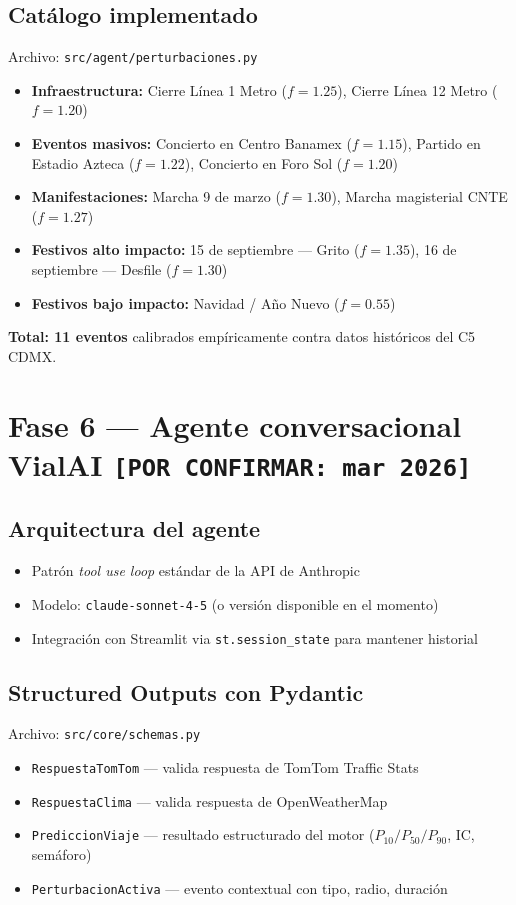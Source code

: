 \documentclass[11pt,a4paper]{article}
\begin{document}
\subsection{Catálogo implementado}
Archivo: \texttt{src/agent/perturbaciones.py}
\begin{itemize}
  \item \textbf{Infraestructura:} Cierre Línea 1 Metro ($f = 1.25$), Cierre Línea 12 Metro ($f = 1.20$)
  \item \textbf{Eventos masivos:} Concierto en Centro Banamex ($f = 1.15$), Partido en Estadio Azteca ($f = 1.22$), Concierto en Foro Sol ($f = 1.20$)
  \item \textbf{Manifestaciones:} Marcha 9 de marzo ($f = 1.30$), Marcha magisterial CNTE ($f = 1.27$)
  \item \textbf{Festivos alto impacto:} 15 de septiembre --- Grito ($f = 1.35$), 16 de septiembre --- Desfile ($f = 1.30$)
  \item \textbf{Festivos bajo impacto:} Navidad / Año Nuevo ($f = 0.55$)
\end{itemize}
\textbf{Total: 11 eventos} calibrados empíricamente contra datos históricos del C5 CDMX.

\section{Fase 6 --- Agente conversacional VialAI \texttt{[POR CONFIRMAR: mar 2026]}}

\subsection{Arquitectura del agente}
\begin{itemize}
  \item Patrón \textit{tool use loop} estándar de la API de Anthropic
  \item Modelo: \texttt{claude-sonnet-4-5} (o versión disponible en el momento)
  \item Integración con Streamlit via \texttt{st.session\_state} para mantener historial
\end{itemize}

\subsection{Structured Outputs con Pydantic}
Archivo: \texttt{src/core/schemas.py}
\begin{itemize}
  \item \texttt{RespuestaTomTom} --- valida respuesta de TomTom Traffic Stats
  \item \texttt{RespuestaClima} --- valida respuesta de OpenWeatherMap
  \item \texttt{PrediccionViaje} --- resultado estructurado del motor ($P_{10}/P_{50}/P_{90}$, IC, semáforo)
  \item \texttt{PerturbacionActiva} --- evento contextual con tipo, radio, duración
\end{itemize}
\end{document}
